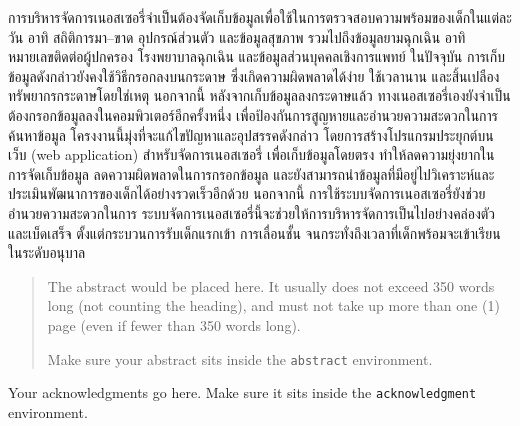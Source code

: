 \maketitle
\makesignature

\ifproject
\begin{abstractTH}
การบริหารจัดการเนอสเซอรี่จำเป็นต้องจัดเก็บข้อมูลเพื่อใช้ในการตรวจสอบความพร้อมของเด็กในแต่ละวัน อาทิ สถิติการมา--ขาด อุปกรณ์ส่วนตัว และข้อมูลสุขภาพ รวมไปถึงข้อมูลยามฉุกเฉิน อาทิ หมายเลขติดต่อผู้ปกครอง โรงพยาบาลฉุกเฉิน และข้อมูลส่วนบุคคลเชิงการแพทย์
\enskip
ในปัจจุบัน การเก็บข้อมูลดังกล่าวยังคงใช้วิธีกรอกลงบนกระดาษ ซึ่งเกิดความผิดพลาดได้ง่าย ใช้เวลานาน และสิ้นเปลืองทรัพยากรกระดาษโดยใช่เหตุ
นอกจากนี้ หลังจากเก็บข้อมูลลงกระดาษแล้ว ทางเนอสเซอรี่เองยังจำเป็นต้องกรอกข้อมูลลงในคอมพิวเตอร์อีกครั้งหนึ่ง เพื่อป้องกันการสูญหายและอำนวยความสะดวกในการค้นหาข้อมูล
\enskip
โครงงานนี้มุ่งที่จะแก้ไขปัญหาและอุปสรรคดังกล่าว โดยการสร้างโปรแกรมประยุกต์บนเว็บ (web application) สำหรับจัดการเนอสเซอรี่ เพื่อเก็บข้อมูลโดยตรง ทำให้ลดความยุ่งยากในการจัดเก็บข้อมูล ลดความผิดพลาดในการกรอกข้อมูล และยังสามารถนำข้อมูลที่มีอยู่ไปวิเคราะห์และประเมินพัฒนาการของเด็กได้อย่างรวดเร็วอีกด้วย
\enskip
นอกจากนี้ การใช้ระบบจัดการเนอสเซอรี่ยังช่วยอำนวยความสะดวกในการ
\enskip
ระบบจัดการเนอสเซอรี่นี้จะช่วยให้การบริหารจัดการเป็นไปอย่างคล่องตัวและเบ็ดเสร็จ ตั้งแต่กระบวนการรับเด็กแรกเข้า การเลื่อนชั้น จนกระทั่งถึงเวลาที่เด็กพร้อมจะเข้าเรียนในระดับอนุบาล


\end{abstractTH}

\begin{abstract}
The abstract would be placed here. It usually does not exceed 350 words
long (not counting the heading), and must not take up more than one (1) page
(even if fewer than 350 words long).

Make sure your abstract sits inside the \texttt{abstract} environment.
\end{abstract}

\iffalse
\begin{dedication}
This document is dedicated to all Chiang Mai University students.

Dedication page is optional.
\end{dedication}
\fi %

\begin{acknowledgments}
Your acknowledgments go here. Make sure it sits inside the
\texttt{acknowledgment} environment.

\end{acknowledgments}%
\fi %

\contentspage

\ifproject
\figurelistpage

\tablelistpage
\fi %



